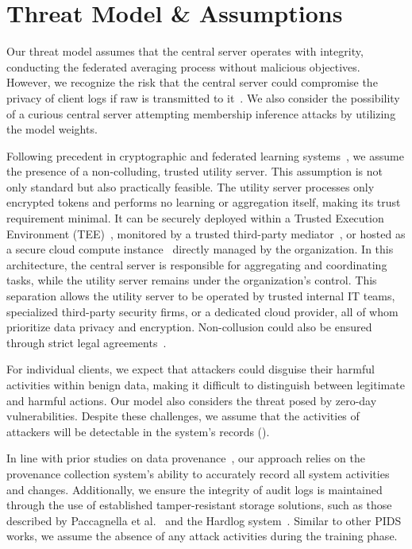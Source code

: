 
\section{Threat Model \& Assumptions}
\label{threat}

Our threat model assumes that the central server operates with integrity, conducting the federated averaging process without malicious objectives. However, we recognize the risk that the central server could compromise the privacy of client logs if raw \logs is transmitted to it~\cite{man2021intelligent,li2023efficient}. We also consider the possibility of a curious central server attempting membership inference attacks by utilizing the model weights.

 Following precedent in cryptographic and federated learning systems~\cite{roy2020crypte,wu2022federated,zhao2024superfl}, we assume the presence of a non-colluding, trusted utility server. This assumption is not only standard but also practically feasible. The utility server processes only encrypted tokens and performs no learning or aggregation itself, making its trust requirement minimal. It can be securely deployed within a Trusted Execution Environment (TEE)~\cite{mckeen2016intel}, monitored by a trusted third-party mediator~\cite{alwen2009collusion}, or hosted as a secure cloud compute instance~\cite{cloudinstance} directly managed by the organization. In this architecture, the central server is responsible for aggregating and coordinating tasks, while the utility server remains under the organization's control. This separation allows the utility server to be operated by trusted internal IT teams, specialized third-party security firms, or a dedicated cloud provider, all of whom prioritize data privacy and encryption. Non-collusion could also be ensured through strict legal agreements~\cite{roy2020crypte}.

 For individual clients, we expect that attackers could disguise their harmful activities within benign data, making it difficult to distinguish between legitimate and harmful actions. Our model also considers the threat posed by zero-day vulnerabilities. Despite these challenges, we assume that the activities of attackers will be detectable in the system's records (\logs).

 In line with prior studies on data provenance~\cite{streamspot,provdetector2020,wang2022threatrace,shadewatcher,yangprographer,han2020unicorn,jia2023magic,flash2024,cheng2023kairos,sigl,inam2023sok}, our approach relies on the provenance collection system's ability to accurately record all system activities and changes. Additionally, we ensure the integrity of audit logs is maintained through the use of established tamper-resistant storage solutions, such as those described by Paccagnella et al.~\cite{paccagnella2020custos} and the Hardlog system~\cite{hardlog}. Similar to other PIDS works, we assume the absence of any attack activities during the training phase.

